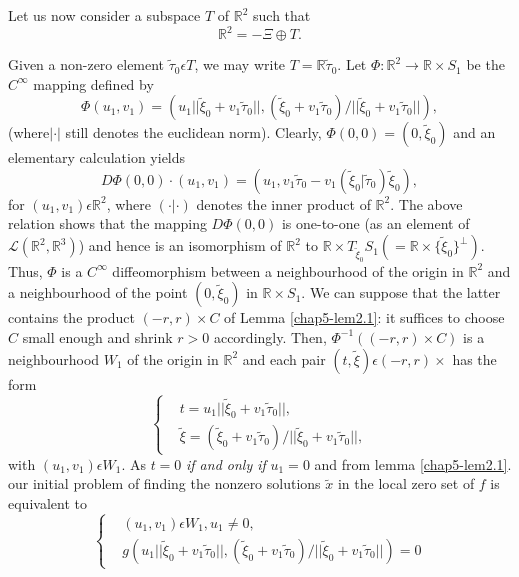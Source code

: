 Let us now consider a subspace $T$ of $\mathbb{R}^{2}$ such that
\begin{equation*}
\mathbb{R}^{2} =- \Xi \oplus T.\tag{2.7}\label{chap5-eq2.7}
\end{equation*}

Given a non-zero element $\widetilde{\tau}_{0} \epsilon T$, we may
write $T = \mathbb{R}\widetilde{\tau}_{0}$. Let $\Phi : \mathbb{R}^{2}
\to \mathbb{R} \times S_{1}$ be the $C^{\infty}$ mapping defined by
\begin{equation*}
\Phi(u_{1}, v_{1}) = (u_{1} ||\widetilde{\xi}_{0} + v_{1}
\widetilde{\tau}_{0}||, (\widetilde{\xi}_{0} +
v_{1}\widetilde{\tau}_{0}) / ||\widetilde{\xi}_{0} + v_{1}\widetilde{\tau}_{0}||),\tag{2.8}\label{chap5-eq2.8}
\end{equation*}
(where\pageoriginale $|\cdot|$ still denotes the euclidean
norm). Clearly, $\Phi(0, 0) = (0, \widetilde{\xi}_{0})$ and an
elementary calculation yields
$$
D\Phi(0, 0) \cdot (u_{1}, v_{1}) = (u_{1}, v_{1} \widetilde{\tau}_{0}
- v_{1}(\widetilde{\xi}_{0} | \widetilde{\tau}_{0})\widetilde{\xi}_{0}),
$$
for $(u_{1}, v_{1}) \epsilon \mathbb{R}^{2}$, where $(\cdot | \cdot)$
denotes the inner product of $\mathbb{R}^{2}$. The above relation
shows that the mapping $D\Phi(0, 0)$ is one-to-one (as an element of
$\mathscr{L} (\mathbb{R}^{2}, \mathbb{R}^{3})$) and hence is an
isomorphism of $\mathbb{R}^{2}$ to $\mathbb{R} \times
T_{\widetilde{\xi}_{0}}S_{1} (= \mathbb{R} \times
\{\widetilde{\xi}_{0}\}^{\perp})$. Thus, $\Phi$ is a $C^{\infty}$
diffeomorphism between a neighbourhood of the origin in
$\mathbb{R}^{2}$ and a neighbourhood of the point $(0,
\widetilde{\xi}_{0})$ in $\mathbb{R} \times S_{1}$. We can suppose
that the latter contains the product $(-r, r) \times C$ of Lemma
\ref{chap5-lem2.1}: it suffices to choose $C$ small enough and shrink
$r > 0$ accordingly. Then, $\Phi^{-1} ((-r, r) \times C)$ is a
neighbourhood $W_{1}$ of the origin in $\mathbb{R}^{2}$ and each pair
$(t, \widetilde{\xi}) \epsilon (-r, r) \times$ has the form
\begin{equation*}
\begin{cases}
& t = u_{1} ||\widetilde{\xi}_{0} + v_{1}\widetilde{\tau}_{0}||,\\
& \widetilde{\xi} = (\widetilde{\xi}_{0} + v_{1}\widetilde{\tau}_{0})/
  ||\widetilde{\xi}_{0} + v_{1}\widetilde{\tau}_{0}||,
\end{cases}
\end{equation*}
with $(u_{1}, v_{1}) \epsilon W_{1}$. As $t = 0$ {\em if and only if}
$u_{1} = 0$ and from lemma \ref{chap5-lem2.1}. our initial problem
of finding the nonzero solutions $\widetilde{x}$ in the local zero set
of $f$ is equivalent to
\begin{equation*}
\begin{cases}
& (u_{1}, v_{1}) \epsilon W_{1}, u_{1} \neq 0,\\
& g(u_{1}||\widetilde{\xi}_{0} + v_{1}\widetilde{\tau}_{0}||,
  (\widetilde{\xi}_{0} + v_{1}\widetilde{\tau}_{0}) /
  ||\widetilde{\xi}_{0} + v_{1}\widetilde{\tau}_{0}||) = 0
\end{cases}
\end{equation*}

